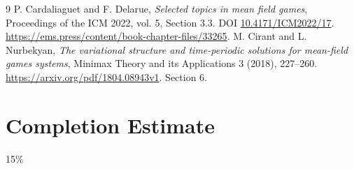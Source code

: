 \documentclass[11pt]{article}
\begin{document}
\begin{thebibliography}{9}
 P. Cardaliaguet and F. Delarue,
\emph{Selected topics in mean field games}, Proceedings of the ICM 2022,
vol. 5, Section 3.3. DOI \href{https://doi.org/10.4171/ICM2022/17}{10.4171/ICM2022/17}.
\url{https://ems.press/content/book-chapter-files/33265}.
 M. Cirant and L. Nurbekyan,
\emph{The variational structure and time-periodic solutions for mean-field games systems},
Minimax Theory and its Applications 3 (2018), 227--260.
\url{https://arxiv.org/pdf/1804.08943v1}. Section 6.
\end{thebibliography}
\section{Completion Estimate}
15\%
\end{document}
